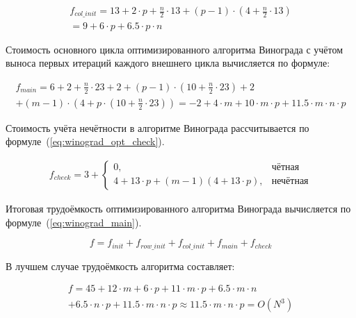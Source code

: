\begin{equation}
    \label{eq:col_init_opt}
    \begin{gathered}
        f_{col\_init} = 13 + 2 \cdot p + \frac{n}{2} \cdot 13 + (p-1)\cdot(4 + \frac{n}{2}\cdot 13) \\ = 9 + 6 \cdot p + 6.5 \cdot p \cdot n
    \end{gathered} 
\end{equation}

Стоимость основного цикла оптимизированного алгоритма Винограда с учётом выноса первых итераций каждого внешнего цикла вычисляется по формуле:

\begin{equation}
    \begin{gathered}
        f_{main} = 6 + 2 + \frac{n}{2} \cdot 23 + 2 + (p - 1)\cdot(10 + \frac{n}{2}\cdot 23)
        + 2 \\ + (m - 1) \cdot (4 + p \cdot (10 + \frac{n}{2} \cdot 23)) = -2 + 4\cdot m + 10 \cdot m \cdot p + 11.5 \cdot m \cdot n \cdot p
    \end{gathered}
\end{equation}

Стоимость учёта нечётности в алгоритме Винограда рассчитывается по формуле~(\ref{eq:winograd_opt_check}).

\begin{equation}
    \label{eq:winograd_opt_check}
    \begin{gathered}
        f_{check} = 3 + \begin{cases}
            0, & \text{чётная} \\
            4 + 13 \cdot p + (m - 1)(4 + 13 \cdot p), & \text{нечётная}
        \end{cases}
    \end{gathered}
\end{equation}

Итоговая трудоёмкость оптимизированного алгоритма Винограда вычисляется по формуле~(\ref{eq:winograd_main}).

\begin{equation}
    \label{eq:winograd_main}
    f = f_{init} + f_{row\_init} + f_{col\_init} + f_{main} + f_{check}
\end{equation}

В лучшем случае трудоёмкость алгоритма составляет:

\begin{equation}
    \begin{gathered}
        f = 45 + 12\cdot m + 6 \cdot p + 11\cdot m\cdot p + 6.5 \cdot m \cdot n \\ + 6.5 \cdot n \cdot p + 11.5 \cdot m \cdot n \cdot p \approx 11.5 \cdot m \cdot n \cdot p = O(N^3)
    \end{gathered}
\end{equation}

